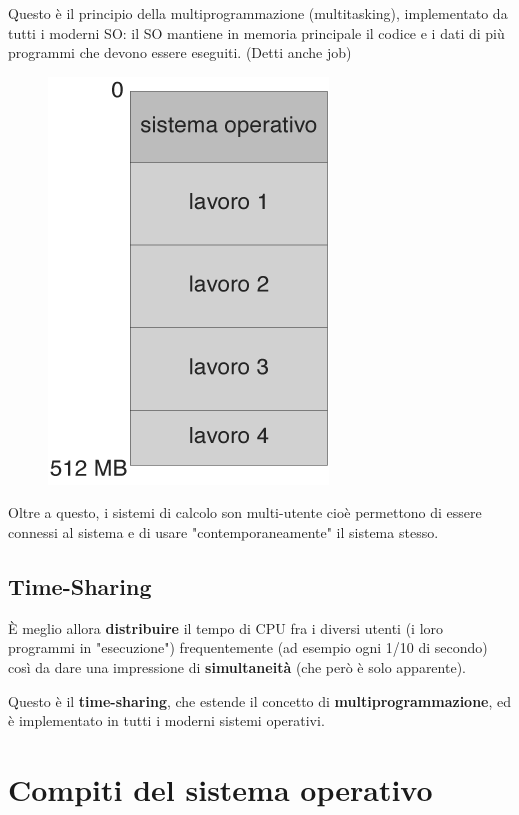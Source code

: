 Questo è il principio della multiprogrammazione (multitasking), implementato da tutti i moderni SO: il SO mantiene in memoria principale il codice e i dati di più programmi che devono essere eseguiti. (Detti anche job)
\begin{figure}[h]
    \centering
    \includegraphics[width=0.25\linewidth]{images/multiprogramming-stack.png}
\end{figure}

Oltre a questo, i sistemi di calcolo son multi-utente cioè permettono di essere connessi al sistema e di usare "contemporaneamente" il sistema stesso.

\subsection{Time-Sharing}
È meglio allora \textbf{distribuire} il tempo di CPU fra i diversi utenti (i loro programmi in "esecuzione") frequentemente (ad esempio ogni 1/10 di secondo) così da dare una impressione di \textbf{simultaneità} (che però è solo apparente).

Questo è il \textbf{time-sharing}, che estende il concetto di \textbf{multiprogrammazione}, ed è implementato in tutti i moderni sistemi operativi.

\section{Compiti del sistema operativo}


